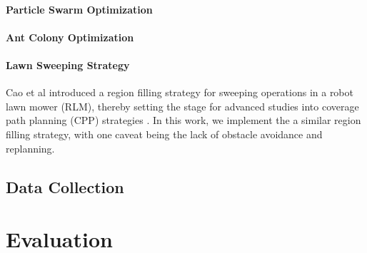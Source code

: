 \documentclass{report}
\begin{document}
\subsubsection{Particle Swarm Optimization}
\subsubsection{Ant Colony Optimization}
\subsubsection{Lawn Sweeping Strategy}
Cao et al \cite{Cao1988} introduced a region filling strategy for sweeping operations in a robot lawn mower (RLM), thereby setting the stage for advanced studies into coverage path planning (CPP) strategies \cite{Galceran2013}. In this work, we implement the a similar region filling strategy, with one caveat being the lack of obstacle avoidance and replanning.

\section{Data Collection}

\chapter{Evaluation} \label{evaluation}
\end{document}
